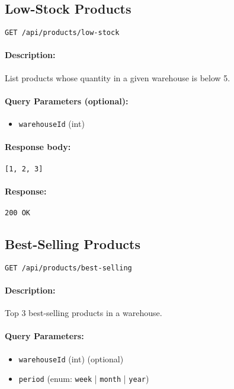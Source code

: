 \documentclass[a4paper,11pt]{article}
\begin{document}
\subsection{Low-Stock Products}
\label{sec:products-low}
\begin{verbatim}
GET /api/products/low-stock
\end{verbatim}
\paragraph{Description:} List products whose quantity in a given warehouse is below 5.
\paragraph{Query Parameters (optional):}
\begin{itemize}
  \item \texttt{warehouseId} (int)
\end{itemize}
\paragraph{Response body:}
\begin{verbatim}
[1, 2, 3]
\end{verbatim}
\paragraph{Response:} \texttt{200 OK}

\subsection{Best-Selling Products}
\label{sec:products-best}
\begin{verbatim}
GET /api/products/best-selling
\end{verbatim}
\paragraph{Description:} Top 3 best-selling products in a warehouse.
\paragraph{Query Parameters:}
\begin{itemize}
  \item \texttt{warehouseId} (int) (optional)
  \item \texttt{period} (enum: \texttt{week} | \texttt{month} | \texttt{year})
\end{itemize}
\end{document}
